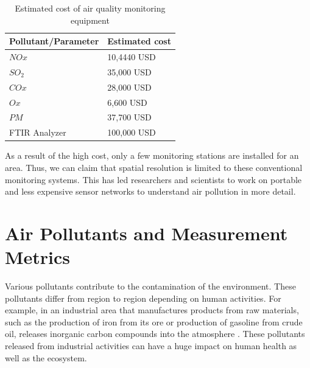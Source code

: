  \begin{table}[h]
   
   
     \begin{tabularx}{\columnwidth}{X|X}
         \hline
         Pollutant/Parameter           & Estimated cost    \\
         \hline
     
       $NOx$   & 10,4440         USD \\ 
       $SO_2$   & 35,000          USD \\ 
       $COx$   & 28,000          USD\\ 
       $Ox$   & 6,600            USD\\ 
       $PM$   & 37,700           USD\\ 
      
       FTIR Analyzer   & 100,000 USD\\ \hline
      
         
       
   \end{tabularx}
     \caption{Estimated cost of air quality monitoring equipment \cite{Mussatti2000}}
     \label{table:cost}
   \end{table}
 
 
 As a result of the high cost, only a few monitoring stations are installed for an area. Thus, we can claim that spatial resolution is limited to these conventional monitoring systems. This has led researchers and scientists to work on portable and less expensive sensor networks to understand air pollution in more detail.
 


 
\section{Air Pollutants and Measurement Metrics}


Various pollutants contribute to the contamination of the environment. These pollutants differ from region to region depending on human activities. For example, in an industrial area that manufactures products from raw materials, such as the production of iron from its ore or production of gasoline from crude oil, releases inorganic carbon compounds into the atmosphere \cite{Vallero2014}. These pollutants released from industrial activities can have a huge impact on human health as well as the ecosystem.  %

